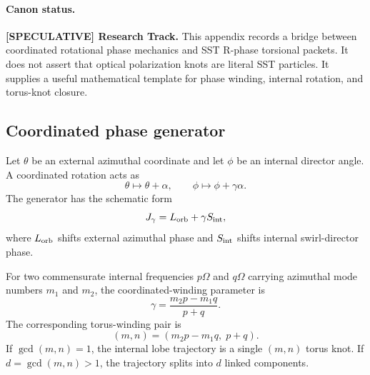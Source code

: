 \paragraph{Canon status.}
\textbf{[SPECULATIVE] Research Track.}
This appendix records a bridge between coordinated rotational phase mechanics and SST R-phase torsional packets. It does not assert that optical polarization knots are literal SST particles. It supplies a useful mathematical template for phase winding, internal rotation, and torus-knot closure.

\subsection{Coordinated phase generator}
Let $\theta$ be an external azimuthal coordinate and let $\phi$ be an internal director angle. A coordinated rotation acts as
\begin{equation}
    \theta\mapsto \theta+\alpha,
    \qquad
    \phi\mapsto \phi+\gamma\alpha.
\end{equation}
The generator has the schematic form
\begin{equation}
    J_\gamma = L_{\rm orb}+\gamma S_{\rm int},
    \label{eq:jgamma_sst}
\end{equation}
where $L_{\rm orb}$ shifts external azimuthal phase and $S_{\rm int}$ shifts internal swirl-director phase.

For two commensurate internal frequencies $p\Omega$ and $q\Omega$ carrying azimuthal mode numbers $m_1$ and $m_2$, the coordinated-winding parameter is
\begin{equation}
    \gamma
    =\frac{m_2p-m_1q}{p+q}.
    \label{eq:gamma_fractional_winding}
\end{equation}
The corresponding torus-winding pair is
\begin{equation}
    (m,n)=\left(m_2p-m_1q,\;p+q\right).
    \label{eq:torus_pair_fractional_phase}
\end{equation}
If $\gcd(m,n)=1$, the internal lobe trajectory is a single $(m,n)$ torus knot. If $d=\gcd(m,n)>1$, the trajectory splits into $d$ linked components.

